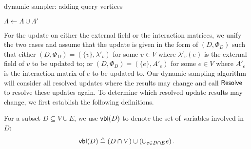 \begin{algorithm}[H]
\caption{dynamic sampler: adding query vertices} \label{Alg:update-variables}
$\Lambda\gets \Lambda\cup \Lambda'$\;
\end{algorithm}


For the update on either the external field or the interaction matrices, we unify the two cases and assume that the update is given in the form of $(D,\Phi_D)$ such that either $(D,\Phi_D)=(\{v\},\lambda'_v)$ for some $v\in V$ where $\lambda'_v(e)$ is the external field of $v$ to be updated to; or $(D,\Phi_D)=(\{e\},A'_e)$ for some $e\in V$ where $A'_e$ is the interaction matrix of $e$ to be updated to. 
Our dynamic sampling algorithm will consider all resolved updates where the results may change and call $\textnormal{\textsf{Resolve}}$ to resolve these updates again. To determine which resolved update results may change, we first establish the following definitions.

\begin{definition}\label{def:vbl-set}
For a subset $D\subseteq V\cup E$, we use $\textnormal{\textsf{vbl}}(D)$ to denote the set of variables involved in $D$:
\begin{align}
\textnormal{\textsf{vbl}}(D) \triangleq \left(D\cap V\right) \cup \left( \cup_{e\in {D\cap E}} e\right).
\end{align}
\end{definition}

